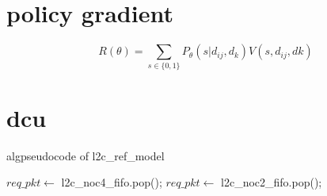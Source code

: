 \documentclass[3p,review]{elsarticle}
\begin{document}
\section{policy gradient}



\begin{equation}\label{eq:p}
  R(\theta)=\sum_{s\in\{0,1\}}P_{\theta}(s|d_{ij},d_k)V(s,d_{ij},d{k})
\end{equation}



\section{dcu}
%
%



\begin{algorithm}
\caption{algpseudocode of l2c\_ref\_model}
\begin{algorithmic}[1]
		\State $req\_pkt \leftarrow$ l2c\_noc4\_fifo.pop();
		\State $req\_pkt \leftarrow$ l2c\_noc2\_fifo.pop();
	\EndIf
	
\EndWhile
\end{algorithmic}
\end{algorithm}
\end{document}

